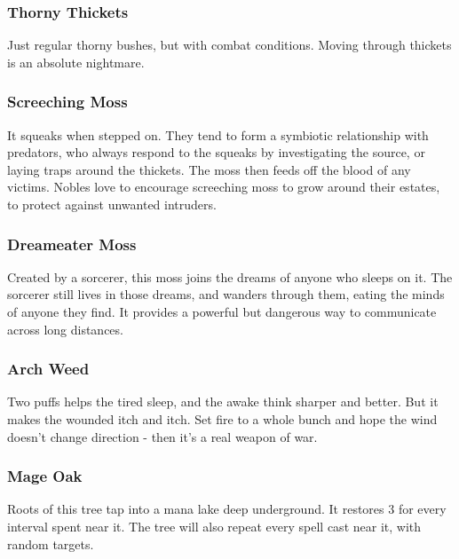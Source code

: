 \begin{multicols}{2}
\subsubsection{Thorny Thickets}
\label{thorny_thickets}

Just regular thorny bushes, but with combat conditions.
Moving through thickets is an absolute nightmare.

\subsubsection{Screeching Moss}
\label{screeching_moss}

It squeaks when stepped on.
They tend to form a symbiotic relationship with predators, who always respond to the squeaks by investigating the source, or laying traps around the thickets.
The moss then feeds off the blood of any victims.
Nobles love to encourage screeching moss to grow around their estates, to protect against unwanted intruders.

\subsubsection{Dreameater Moss}
\label{dreameater_moss}

Created by a sorcerer, this moss joins the dreams of anyone who sleeps on it.
The sorcerer still lives in those dreams, and wanders through them, eating the minds of anyone they find.
It provides a powerful but dangerous way to communicate across long distances.

\subsubsection{Arch Weed}
\label{arch_weed}

Two puffs helps the tired sleep, and the awake think sharper and better.
But it makes the wounded itch and itch.
Set fire to a whole bunch and hope the wind doesn't change direction - then it's a real weapon of war.

\subsubsection{Mage Oak}
\label{mage_oak}

Roots of this tree tap into a mana lake deep underground.
It restores 3  for every \gls{interval} spent near it.
The tree will also repeat every spell cast near it, with random targets.


\end{multicols}
